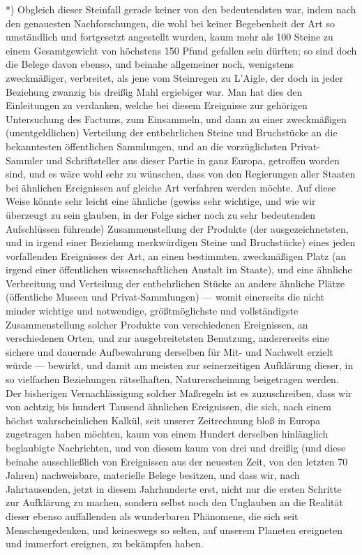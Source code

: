\documentclass[a4paper, 11pt, oneside, german]{article}
\begin{document}
*) Obgleich dieser Steinfall gerade keiner von den bedeutendsten war, indem nach den genauesten Nachforschungen, die wohl bei keiner Begebenheit der Art so umständlich und fortgesetzt angestellt wurden, kaum mehr als 100 Steine zu einem Gesamtgewicht von höchstens 150 Pfund gefallen sein dürften; so sind doch die Belege davon ebenso, und beinahe allgemeiner noch, wenigstens zweckmäßiger, verbreitet, als jene vom Steinregen zu L'Aigle, der doch in jeder Beziehung zwanzig bis dreißig Mahl ergiebiger war. Man hat dies den Einleitungen zu verdanken, welche bei diesem Ereignisse zur gehörigen Untersuchung des Factums, zum Einsammeln, und dann zu einer zweckmäßigen (unentgeldlichen) Verteilung der entbehrlichen Steine und Bruchstücke an die bekanntesten öffentlichen Sammlungen, und an die vorzüglichsten Privat-Sammler und Schriftsteller aus dieser Partie in ganz Europa, getroffen worden sind, und es wäre wohl sehr zu wünschen, dass von den Regierungen aller Staaten bei ähnlichen Ereignissen auf gleiche Art verfahren werden möchte. Auf diese Weise könnte sehr leicht eine ähnliche (gewiss sehr wichtige, und wie wir überzeugt zu sein glauben, in der Folge sicher noch zu sehr bedeutenden Aufschlüssen führende) Zusammenstellung der Produkte (der ausgezeichnetsten, und in irgend einer Beziehung merkwürdigen Steine und Bruchstücke) eines jeden vorfallenden Ereignisses der Art, an einen bestimmten, zweckmäßigen Platz (an irgend einer öffentlichen wissenschaftlichen Anstalt im Staate), und eine ähnliche Verbreitung und Verteilung der entbehrlichen Stücke an andere ähnliche Plätze (öffentliche Museen und Privat-Sammlungen) --- womit einerseits die nicht minder wichtige und notwendige, größtmöglichste und vollständigste Zusammenstellung solcher Produkte von verschiedenen Ereignissen, an verschiedenen Orten, und zur ausgebreitetsten Benutzung, andererseits eine sichere und dauernde Aufbewahrung derselben für Mit- und Nachwelt erzielt würde --- bewirkt, und damit am meisten zur seinerzeitigen Aufklärung dieser, in so vielfachen Beziehungen rätselhaften, Naturerscheinung beigetragen werden. Der bisherigen Vernachlässigung solcher Maßregeln ist es zuzuschreiben, dass wir von achtzig bis hundert Tausend ähnlichen Ereignissen, die sich, nach einem höchst wahrscheinlichen Kalkül, seit unserer Zeitrechnung bloß in Europa zugetragen haben möchten, kaum von einem Hundert derselben hinlänglich beglaubigte Nachrichten, und von diesem kaum von drei und dreißig (und diese beinahe ausschließlich von Ereignissen aus der neuesten Zeit, von den letzten 70 Jahren) nachweisbare, materielle Belege besitzen, und dass wir, nach Jahrtausenden, jetzt in diesem Jahrhunderte erst, nicht nur die ersten Schritte zur Aufklärung zu machen, sondern selbst noch den Unglauben an die Realität dieser ebenso auffallenden als wunderbaren Phänomene, die sich seit Menschengedenken, und keineswegs so selten, auf unserem Planeten ereigneten und immerfort ereignen, zu bekämpfen haben.
\end{document}

